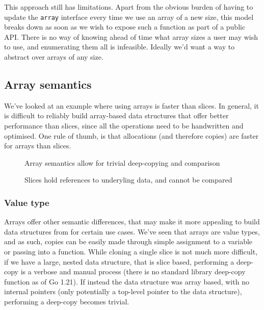 
This approach still has limitations. Apart from the obvious burden of having to
update the \texttt{array} interface every time we use an array of a new size,
this model breaks down as soon as we wish to expose such a function as part of a
public API. There is no way of knowing ahead of time what array sizes a user may
wish to use, and enumerating them all is infeasible. Ideally we'd want a way to
abstract over arrays of any size.


\subsection{Array semantics}


We've looked at an example where using arrays is faster than slices. In general,
it is difficult to reliably build array-based data structures that offer better
performance than slices, since all the operations need to be handwritten and
optimised. One rule of thumb, is that allocations (and therefore copies) are
faster for arrays than slices.


\begin{figure}
	\caption{Array semantics allow for trivial deep-copying and comparison}
\end{figure}

\begin{figure}
	\caption{Slices hold references to underyling data, and cannot be compared}
\end{figure}

\subsubsection{Value type}

Arrays offer other semantic differences, that may make it more appealing to
build data structures from for certain use cases. We've seen that arrays are
value types, and as such, copies can be easily made through simple assignment to
a variable or passing into a function. While cloning a single slice is not much
more difficult, if we have a large, nested data structure, that is slice based,
performing a deep-copy is a verbose and manual process (there is no standard
library deep-copy function as of Go 1.21). If instead the data structure was
array based, with no internal pointers (only potentially a top-level pointer to
the data structure), performing a deep-copy becomes trivial.

